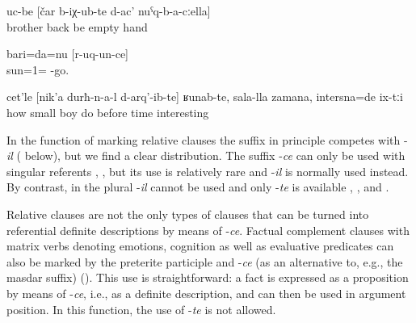 \begin{exe}
		\ex	\label{ex:the brothers who came home with empty hands}
		\gll	uc-be	[čar	b-iχ-ub-te	d-ac'	nuˁq-b-a-cːella]\\
			brother	back	be empty	hand\\
		\glt	{}

\ex	\label{I am the sun that shines (lit. goes).}
	\gll bari=da=nu	[r-uq-un-ce]\\
	sun=1=		-go.\\
	\glt	{}

	\ex	\label{ex:How the ones like made by little children, from the old times, they were interesting minor@16c}
	\gll	cet'le	[nik'a	durħ-n-a-l	d-arq'-ib-te]	ʁunab-te,	sala-lla	zamana, 	intersna=de	ix-tːi\\
		how	small	boy	do 		before	time	interesting	\\
	\glt	{}
\end{exe}

In the function of marking relative clauses the suffix in principle competes with -\textit{il} ( below), but we find a clear distribution. The suffix -\textit{ce} can only be used with singular referents , , but its use is relatively rare and -\textit{il} is normally used instead. By contrast, in the plural -\textit{il} cannot be used and only -\textit{te} is available , , and .

Relative clauses are not the only types of clauses that can be turned into referential definite descriptions by means of -\textit{ce}. Factual complement clauses with matrix verbs denoting emotions, cognition as well as evaluative predicates can also be marked by the preterite participle and -\textit{ce} (as an alternative to, e.g., the masdar suffix) (). This use is straightforward: a fact is expressed as a proposition by means of -\textit{ce}, i.e., as a definite description, and can then be used in argument position. In this function, the use of -\textit{te} is not allowed.

